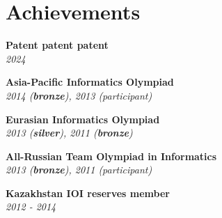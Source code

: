 \documentclass[letterpaper,11pt]{article}
\begin{document}
\section{Achievements}
\parbox[t]{0.45\textwidth}{
    \begin{itemize}[leftmargin=0.15in, label={}]

    \vspace{-12pt}
    \small{\item{
    \textbf{Patent patent patent} \\
    \textit{2024} \\
    }}

    \vspace{-15pt}
    \small{\item{
    \textbf{Asia-Pacific Informatics Olympiad} \\
    \textit{2014 (\textbf{bronze}), 2013 (participant)} \\
    }}

    \vspace{-15pt}
    \small{\item{
    \textbf{Eurasian Informatics Olympiad} \\
    \textit{2013 (\textbf{silver}), 2011 (\textbf{bronze})} \\
    }}

    \end{itemize}
}
\parbox[t]{0.45\textwidth}{
    \begin{itemize}[leftmargin=0.15in, label={}]

        \vspace{-12pt}
        \small{\item{
        \textbf{All-Russian Team Olympiad in Informatics} \\
        \textit{2013 (\textbf{bronze}), 2011 (participant)} \\
        }}

        \vspace{-15pt}
        \small{\item{
        \textbf{Kazakhstan IOI reserves member} \\
        \textit{2012 - 2014} \\
        }}

    \end{itemize}
}

\end{document}
